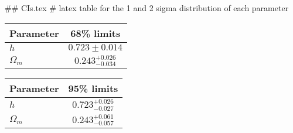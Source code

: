 ## CIs.tex
# latex table for the 1 and 2 sigma distribution of each parameter

\begin{tabular} { l  c}
 Parameter &  68\% limits\\
\hline
{\boldmath$h              $} & $0.723\pm 0.014            $\\
{\boldmath$\Omega_m       $} & $0.243^{+0.026}_{-0.034}   $\\
\hline
\end{tabular}

\begin{tabular} { l  c}
 Parameter &  95\% limits\\
\hline
{\boldmath$h              $} & $0.723^{+0.026}_{-0.027}   $\\
{\boldmath$\Omega_m       $} & $0.243^{+0.061}_{-0.057}   $\\
\hline
\end{tabular}
